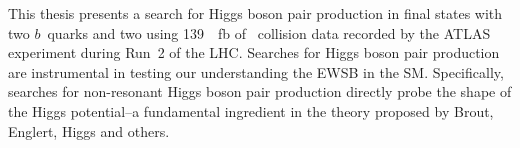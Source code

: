 This thesis presents a search for Higgs boson pair production in final states
with two $b$~quarks and two \tauleptons using \SI{139}{\per\femto\barn} of
\pp~collision data recorded by the ATLAS experiment during Run~2 of the
LHC. Searches for Higgs boson pair production are instrumental in testing our
understanding the EWSB in the SM. Specifically, searches for non-resonant Higgs
boson pair production directly probe the shape of the Higgs potential--a
fundamental ingredient in the theory proposed by Brout, Englert, Higgs and
others.








%
%
%
%
%
%

%
%
%
%
%
%
%


